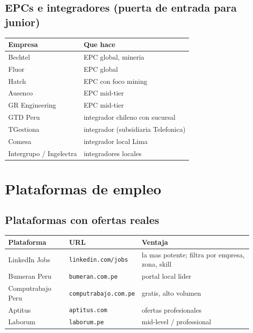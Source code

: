 \documentclass[11pt,a4paper,oneside]{report}
\begin{document}
\section{EPCs e integradores (puerta de entrada para junior)}

\begin{center}
\begin{tabular}{p{4cm}p{8cm}}
\toprule
\textbf{Empresa} & \textbf{Que hace} \\
\midrule
Bechtel        & EPC global, mineria \\
Fluor          & EPC global \\
Hatch          & EPC con foco mining \\
Ausenco        & EPC mid-tier \\
GR Engineering & EPC mid-tier \\
GTD Peru       & integrador chileno con sucursal \\
TGestiona      & integrador (subsidiaria Telefonica) \\
Comesa         & integrador local Lima \\
Intergrupo / Ingelectra & integradores locales \\
\bottomrule
\end{tabular}
\end{center}

\chapter{Plataformas de empleo}

\section{Plataformas con ofertas reales}

\begin{center}
\begin{tabular}{p{3cm}p{4cm}p{6cm}}
\toprule
\textbf{Plataforma} & \textbf{URL} & \textbf{Ventaja} \\
\midrule
LinkedIn Jobs       & \texttt{linkedin.com/jobs}    & la mas potente; filtra por empresa, zona, skill \\
Bumeran Peru        & \texttt{bumeran.com.pe}       & portal local lider \\
Computrabajo Peru   & \texttt{computrabajo.com.pe}  & gratis, alto volumen \\
Aptitus             & \texttt{aptitus.com}          & ofertas profesionales \\
Laborum             & \texttt{laborum.pe}           & mid-level / professional \\
\bottomrule
\end{tabular}
\end{center}
\end{document}
